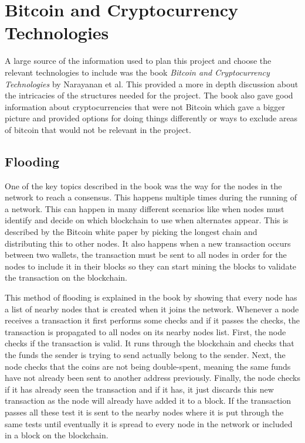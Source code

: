 \documentclass{l4proj}
\begin{document}
\section{Bitcoin and Cryptocurrency Technologies}
A large source of the information used to plan this project and choose the relevant technologies to include was the
book \emph{Bitcoin and Cryptocurrency Technologies} by Narayanan et al. This provided a more in depth discussion
about the intricacies of the structures needed for the project. The book also gave good information about cryptocurrencies
that were not Bitcoin which gave a bigger picture and provided options for doing things differently or ways to 
exclude areas of bitcoin that would not be relevant in the project.

\subsection{Flooding}
One of the key topics described in the book was the way for the nodes in the network to reach a consensus. This happens
multiple times during the running of a network. This can happen in many different scenarios like when 
nodes must identify and decide on which blockchain to use when alternates appear. This is described by the Bitcoin white 
paper by picking the longest chain and distributing this to other nodes. It also happens when a new transaction occurs 
between two wallets, the transaction must be sent to all nodes in order for the nodes to include it in their blocks so 
they can start mining the blocks to validate the transaction on the blockchain.

This method of flooding is explained in the book by showing that every node has a list of nearby nodes that is created
when it joins the network. Whenever a node receives a transaction it first performs some checks and if it passes the 
checks, the transaction is propagated to all nodes on its nearby nodes list. First, the node checks if the transaction is
valid. It runs through the blockchain and checks that the funds the sender is trying to send actually belong to the sender.
Next, the node checks that the coins are not being double-spent, meaning the same funds have not already been sent to another
address previously. Finally, the node checks if it has already seen the transaction and if it has, it just discards this new
transaction as the node will already have added it to a block. If the transaction passes all these test it is sent to the
nearby nodes where it is put through the same tests until eventually it is spread to every node in the network or included
in a block on the blockchain.
\end{document}
